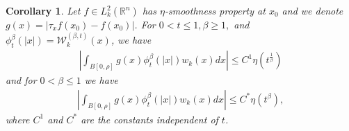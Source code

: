 \documentclass[11pt,a4paper,reqno]{amsproc}
\newtheorem{corollary}[theorem]{Corollary}
\theoremstyle{definition}
\theoremstyle{remark}
\numberwithin{equation}{section}
\begin{document}
\begin{corollary} \label{corollary-5.4}
    Let $f\in L_k^2(\mathbb{R}^n)$ has $\eta$-smoothness property at $x_0$ and we denote $g(x)=|\tau_xf(x_0)-f(x_0)|$. For $0<t\leq 1, \beta \geq 1,$ and 
    $\phi_t^\beta(|x|)=\mathcal{W}_k^{(\beta,t)}(x)$, we have 
    \begin{align*}
       \left| \int_{B[0,\rho]} g(x)\phi_t^\beta(|x|) w_k(x)dx \right| \leq   
       C^1\eta(t^{\frac{1}{\beta}}) 
    \end{align*} and for  $0<\beta\leq 1$ we have 
    \begin{align*}
       \left| \int_{B[0,\rho]} g(x)\phi_t^\beta(|x|) w_k(x)dx \right| \leq C^{*}\eta(t^{\beta}), 
    \end{align*}
    where $C^1$ and $C^{*}$ are the constants independent of $t$. 
\end{corollary}
\end{document}
